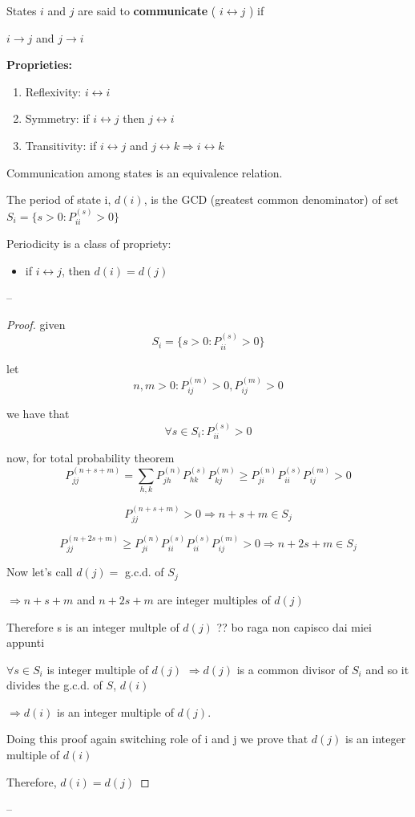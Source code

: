 \begin{definition}

States $i$ and $j$ are said to {\bfseries communicate} ( $ i \leftrightarrow j$ ) if

 $i \rightarrow j$ and $j \rightarrow i$
\end{definition}

{\bfseries Proprieties:}
\begin{enumerate}
\item Reflexivity: \quad $i \leftrightarrow i$
\item Symmetry: \quad if $i \leftrightarrow j$ then $j \leftrightarrow i$
\item Transitivity: \quad if $i \leftrightarrow j$ and $j \leftrightarrow k \Rightarrow i \leftrightarrow k$
 \end{enumerate}
Communication among states is an equivalence relation.

\begin{definition}[Periodicity]
The period of state i, $d(i)$, is the GCD (greatest common denominator) of set $S_i = \{ s>0 : P_{ii}^{(s)} >0 \}$
\end{definition}

\begin{theorem} Periodicity is a class of propriety:
\begin{itemize}
\item if $i \leftrightarrow j$, then $d(i) = d(j)$
\end{itemize}
\end{theorem}
--
\begin{proof}
given $$S_i = \{ s>0 : P_{ii}^{(s)} >0 \}$$

let $$n, m >0 : P_{ij}^{(m)} >0, P_{ij}^{(m)} > 0$$

we have that $$\forall s \in S_i : P_{ii}^{(s)} > 0$$

now, for total probability theorem$$P_{jj}^{(n+s+m)} = \sum_{h, k} P_{jh}^{(n)} P_{hk}^{(s)} P_{kj}^{(m)} \geq P_{ji}^{(n)} P_{ii}^{(s)} P_{ij}^{(m)} >0 $$

$$P_{jj}^{(n+s+m)} >0 \Rightarrow n+s+m \in S_j$$

$$P_{jj}^{(n+2s+m)} \geq P_{ji}^{(n)} P_{ii}^{(s)} P_{ii}^{(s)} P_{ij}^{(m)} >0 \Rightarrow n+2s+m \in S_j$$

Now let's call $d(j) =$ g.c.d. of $S_j$

$ \Rightarrow n+s+m$ and $n+2s+m$ are integer multiples of $d(j)$

Therefore s is an integer multple of $d(j)$ ?? bo raga non capisco dai miei appunti

$\forall s \in S_i$ is integer multiple of $d(j)$ $\Rightarrow d(j)$ is a common divisor of $S_i$ and so it divides the g.c.d. of $S$, $d(i)$

$\Rightarrow d(i)$ is an integer multiple of $d(j)$.

Doing this proof again switching role of i and j we prove that $d(j)$ is an integer multiple of $d(i)$

Therefore, $d(i) = d(j)$

\end{proof}
--

